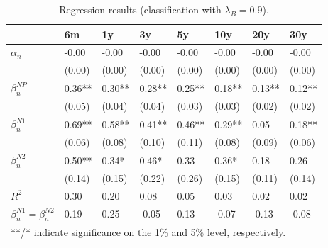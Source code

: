 \documentclass[11pt,a4paper,english,oneside]{book}
\numberwithin{equation}{chapter}
\begin{document}
\begin{table}[h] %
	\centering %
	\begin{tabular}{ p{2cm}  p{1cm} p{1cm} p{1cm} p{1cm} p{1cm} p{1cm} p{1cm} } %
		\toprule %
		& 6m 		& 1y 		& 3y 		& 5y 		& 10y 		& 20y 		& 30y \\
		\midrule %
		$\alpha_n$ & -0.00 & -0.00 & -0.00 & -0.00 & -0.00 & -0.00 & -0.00\\
		& (0.00) & (0.00) & (0.00) & (0.00) & (0.00) & (0.00) & (0.00)\\
		$\beta_n^{NP}$ & 0.36** & 0.30** & 0.28** & 0.25** & 0.18** & 0.13** & 0.12**\\
		& (0.05) & (0.04) & (0.04) & (0.03) & (0.03) & (0.02) & (0.02)\\
		$\beta_n^{N1}$ & 0.69** & 0.58** & 0.41** & 0.46** & 0.29** & 0.05 & 0.18**\\
		& (0.06) & (0.08) & (0.10) & (0.11) & (0.08) & (0.09) & (0.06)\\
		$\beta_n^{N2}$ & 0.50** & 0.34* & 0.46* & 0.33 & 0.36* & 0.18 & 0.26\\
		& (0.14) & (0.15) & (0.22) & (0.26) & (0.15) & (0.11) & (0.14)\\
		$R^2$ & 0.30 & 0.20 & 0.08 & 0.05 & 0.03 & 0.02 & 0.02\\
		$\beta_n^{N1} = \beta_n^{N2}$ & 0.19 & 0.25 & -0.05 & 0.13 & -0.07 & -0.13 & -0.08\\
		\midrule																
		\multicolumn{8}{l}{**/* indicate significance on the 1\% and 5\% level, respectively.} \\
		\bottomrule %
	\end{tabular}
	\caption{Regression results (classification with $\lambda_B=0.9$).} %
	\label{tab:reg3} %
\end{table}
\end{document}
